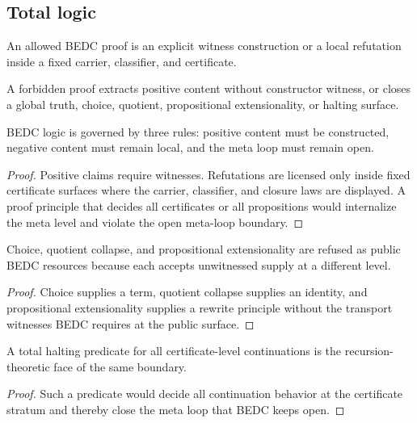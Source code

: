 \subsection{Total logic}
\label{subsec:philosophy-total-logic}

\begin{definition}
\label{def:philosophy-allowed-proof-total}
An allowed BEDC proof is an explicit witness construction or a local
refutation inside a fixed carrier, classifier, and certificate.
\end{definition}

\begin{definition}
\label{def:philosophy-forbidden-proof-total}
A forbidden proof extracts positive content without constructor
witness, or closes a global truth, choice, quotient, propositional
extensionality, or halting surface.
\end{definition}

\begin{theorem}
\label{thm:philosophy-logic-discipline-total}
BEDC logic is governed by three rules: positive content must be
constructed, negative content must remain local, and the meta loop must
remain open.
\end{theorem}
\begin{proof}
Positive claims require witnesses. Refutations are licensed only inside
fixed certificate surfaces where the carrier, classifier, and closure
laws are displayed. A proof principle that decides all certificates or
all propositions would internalize the meta level and violate the open
meta-loop boundary.
\end{proof}

\begin{corollary}
\label{cor:philosophy-classical-shortcuts-one-refusal}
Choice, quotient collapse, and propositional extensionality are refused
as public BEDC resources because each accepts unwitnessed supply at a
different level.
\end{corollary}
\begin{proof}
Choice supplies a term, quotient collapse supplies an identity, and
propositional extensionality supplies a rewrite principle without the
transport witnesses BEDC requires at the public surface.
\end{proof}

\begin{corollary}
\label{cor:philosophy-halting-obstruction-total}
A total halting predicate for all certificate-level continuations is
the recursion-theoretic face of the same boundary.
\end{corollary}
\begin{proof}
Such a predicate would decide all continuation behavior at the
certificate stratum and thereby close the meta loop that BEDC keeps
open.
\end{proof}

